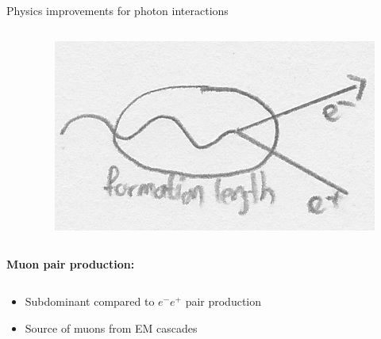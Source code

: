\documentclass[t]{beamer}
\begin{document}
\begin{columns}[onlytextwidth]
\begin{column}{\textwidth}
\begin{block}{Physics improvements for photon interactions}
\begin{minipage}[t]{0.3\textwidth}
\begin{minipage}[t][12cm]{\textwidth}
\begin{columns}[onlytextwidth]
\begin{column}{0.6\textwidth}
                \end{column}
                \begin{column}{0.35\textwidth}%
                  \begin{figure}
                      \includegraphics[width=\linewidth, keepaspectratio]{images/lpm_sketch.png}
                    \end{figure}
                \end{column}
            \end{columns}
          \end{minipage}
          \begin{minipage}[t][12cm]{\textwidth}
            {\Large\textbf{Muon pair production:}}
            \begin{columns}[onlytextwidth]
                \begin{column}{0.6\textwidth}%
                  \begin{itemize}[leftmargin=0.5cm]
                    \item Subdominant compared to $e^- e^+$ pair production
                    \item Source of muons from EM cascades


\end{itemize}
\end{column}
\end{columns}
\end{minipage}
\end{minipage}
\end{block}
\end{column}
\end{columns}
\end{document}
